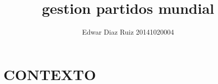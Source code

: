 \documentclass[11pt]{book}
\title{gestion partidos mundial}
\author{ Edwar Diaz Ruiz 20141020004}
\begin{document}
	
	
	
\maketitle
\tableofcontents
\part{CONTEXTO}
%






\end{document}

